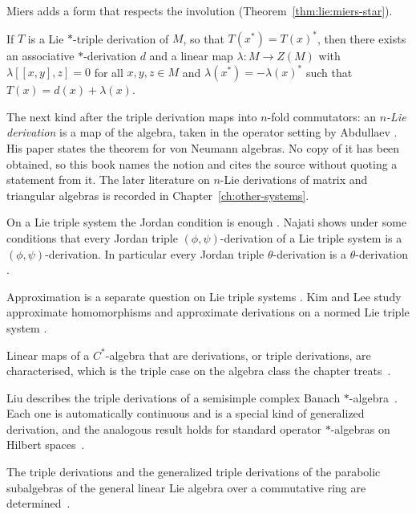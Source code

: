 Miers adds a form that respects the involution
(Theorem~\ref{thm:lie:miers-star}).

\begin{theorem}\label{thm:lie:miers-star}
If $T$ is a Lie $*$-triple derivation of $M$, so that $T(x^{*})=T(x)^{*}$, then
there exists an associative $*$-derivation $d$ and a linear map
$\lambda\colon M\to Z(M)$ with $\lambda[[x,y],z]=0$ for all $x,y,z\in M$ and
$\lambda(x^{*})=-\lambda(x)^{*}$ such that $T(x)=d(x)+\lambda(x)$.
\end{theorem}

The next kind after the triple derivation maps into $n$-fold commutators:
an \emph{$n$-Lie derivation} is a map of the algebra, taken in the operator
setting by Abdullaev \cite{Abdullaev1992}.
His paper states the theorem for von Neumann algebras.
No copy of it has been obtained, so this book names the notion and cites the
source without quoting a statement from it.
The later literature on $n$-Lie derivations of matrix and triangular algebras
is recorded in Chapter~\ref{ch:other-systems}.

On a Lie triple system the Jordan condition is enough \cite[Abstract,
p.~143]{Najati2009LieTripleSystems}. Najati shows under some conditions that
every Jordan triple $(\phi,\psi)$-derivation of a Lie triple system is a
$(\phi,\psi)$-derivation. In particular every Jordan triple
$\theta$-derivation is a $\theta$-derivation \cite[Abstract,
p.~143]{Najati2009LieTripleSystems}.

Approximation is a separate question on Lie triple systems
\cite[Abstract]{KimLee2014Approximate}. Kim and Lee study approximate
homomorphisms and approximate derivations on a normed Lie triple system
\cite[Abstract]{KimLee2014Approximate}.

Linear maps of a $C^*$-algebra that are derivations, or triple derivations,
are characterised, which is the triple case on the algebra class the chapter
treats~\cite{WlLinearMapsOnCAlgebrasWhichAreD2018}.

Liu describes the triple derivations of a semisimple complex Banach
$*$-algebra~\cite{WlTheStructureOfTripleDerivation2017}. Each one is automatically continuous and is a special kind of
generalized derivation, and the analogous result holds for standard operator
$*$-algebras on Hilbert spaces~\cite{WlTheStructureOfTripleDerivation2017}.

The triple derivations and the generalized triple derivations of the parabolic
subalgebras of the general linear Lie algebra over a commutative ring are
determined~\cite{WlTripleAndGeneralizedTripleDeri2020}.
